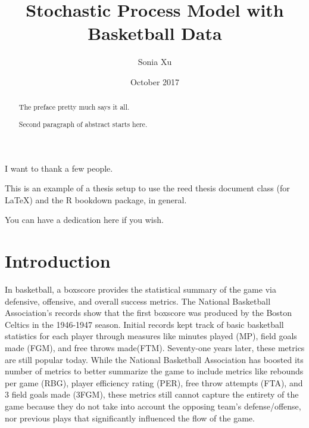 \documentclass[12pt,twoside]{dukestatscithesis}
\title{Stochastic Process Model with Basketball Data}
\author{Sonia Xu}
\date{October 2017}
\theoremstyle{definition}
\theoremstyle{definition}
\theoremstyle{definition}
\theoremstyle{remark}
\begin{document}
  \maketitle

\frontmatter %
\pagestyle{empty} %
  \begin{acknowledgements}
    I want to thank a few people.
  \end{acknowledgements}
  \begin{preface}
    This is an example of a thesis setup to use the reed thesis document
    class (for LaTeX) and the R bookdown package, in general.
  \end{preface}
  \hypersetup{linkcolor=black}
  \setcounter{tocdepth}{2}
  \tableofcontents

  \listoftables

  \listoffigures
  \begin{abstract}
    The preface pretty much says it all. \par
    
    Second paragraph of abstract starts here.
  \end{abstract}
  \begin{dedication}
    You can have a dedication here if you wish.
  \end{dedication}
\mainmatter %
\pagestyle{fancyplain} %

\chapter{Introduction}\label{introduction}

In basketball, a boxscore provides the statistical summary of the game
via defensive, offensive, and overall success metrics. The National
Basketball Association's records show that the first boxscore was
produced by the Boston Celtics in the 1946-1947 season. Initial records
kept track of basic basketball statistics for each player through
measures like minutes played (MP), field goals made (FGM), and free
throws made(FTM). Seventy-one years later, these metrics are still
popular today. While the National Basketball Association has boosted its
number of metrics to better summarize the game to include metrics like
rebounds per game (RBG), player efficiency rating (PER), free throw
attempts (FTA), and 3 field goals made (3FGM), these metrics still
cannot capture the entirety of the game because they do not take into
account the opposing team's defense/offense, nor previous plays that
significantly influenced the flow of the game.
\end{document}
